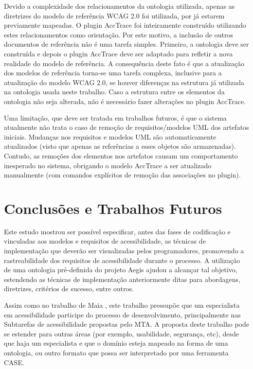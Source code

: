 \documentclass[runningheads,a4paper]{llncs}
\begin{document}
Devido a complexidade dos relacionamentos da ontologia utilizada, apenas as
diretrizes do modelo de referência WCAG 2.0 foi utilizada, por já estarem
previamente mapeadas. O plugin AccTrace foi inteiramente construído
utilizando estes relacionamentos como orientação. Por este motivo, a inclusão de
outros documentos de referência não é uma tarefa simples. Primeiro,
a ontologia deve ser construída e depois o plugin AccTrace deve ser
adaptado para refletir a nova realidade do modelo de referência. A consequência
deste fato é que a atualização dos modelos de referência torna-se uma tarefa
complexa, inclusive para a atualização do modelo WCAG 2.0, se houver diferenças na estrutura já utilizada na ontologia usada neste trabalho.
Caso a estrutura entre os elementos da ontologia não seja alterada, não é necessário fazer alterações no plugin AccTrace.

Uma limitação, que deve ser tratada em trabalhos futuros, é que o sistema
atualmente não trata o caso de remoção de requisitos/modelos UML dos
artefatos iniciais. Mudanças nos requisitos e modelos UML são automaticamente atualizados (visto que apenas as referências a esses objetos são armazenadas).
Contudo, as remoções dos elementos nos artefatos causam um comportamento
inesperado no sistema, obrigando o modelo AccTrace a ser atualizado
manualmente (com comandos explícitos de remoção das associações no
plugin).

\section{Conclusões e Trabalhos Futuros}

Este estudo mostrou ser possível especificar, antes das fases de codificação e vinculadas aos modelos e
requisitos de acessibilidade, as técnicas de implementação que deverão
ser visualizadas pelos programadores, promovendo a rastreabilidade dos requisitos de acessibilidade durante o processo. A utilização de uma ontologia pré-definida do projeto Aegis \cite{aegis:13} ajudou a alcançar tal objetivo, estendendo as
técnicas de implementação anteriormente ditas para abordagens, diretrizes,
critérios de sucesso, entre outros.

Assim como no trabalho de Maia \cite{maia:10}, este trabalho pressupõe que um
especialista em acessibilidade participe do processo de desenvolvimento, principalmente nas
Subtarefas de acessibilidade propostas pelo MTA. A proposta deste trabalho
pode se estender para outras áreas (por exemplo, usabilidade, segurança, etc),
desde que haja um especialista e que o domínio esteja mapeado na forma de uma
ontologia, ou outro formato que possa ser interpretado por uma ferramenta
CASE.
\end{document}
